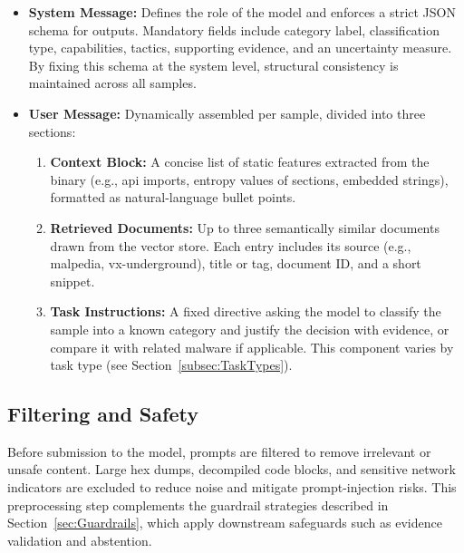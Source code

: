 \begin{itemize}
      \item \textbf{System Message:} Defines the role of the model and enforces a strict JSON schema
            for outputs. Mandatory fields include category label, classification type, capabilities, tactics,
            supporting evidence, and an uncertainty measure. By fixing this schema at the system level,
            structural consistency is maintained across all samples.

      \item \textbf{User Message:} Dynamically assembled per sample, divided into three sections:
            \begin{enumerate}
                  \item \textbf{Context Block:} A concise list of static features extracted from the binary
                        (e.g., \gls{api} imports, entropy values of sections, embedded strings), formatted as natural-language
                        bullet points.
                  \item \textbf{Retrieved Documents:} Up to three semantically similar documents drawn from
                        the vector store. Each entry includes its source (e.g., \gls{malpedia}, \gls{vx-underground}), title or tag,
                        document ID, and a short snippet.
                  \item \textbf{Task Instructions:} A fixed directive asking the model to classify the sample
                        into a known category and justify the decision with evidence, or compare it with related malware
                        if applicable. This component varies by task type (see Section~\ref{subsec:TaskTypes}).
            \end{enumerate}
\end{itemize}

\subsection{Filtering and Safety}\label{subsec:PromptFiltering}
Before submission to the model, prompts are filtered to remove irrelevant or unsafe content. Large
hex dumps, decompiled code blocks, and sensitive network indicators are excluded to reduce noise
and mitigate prompt-injection risks. This preprocessing step complements the guardrail strategies
described in Section~\ref{sec:Guardrails}, which apply downstream safeguards such as evidence
validation and abstention.

